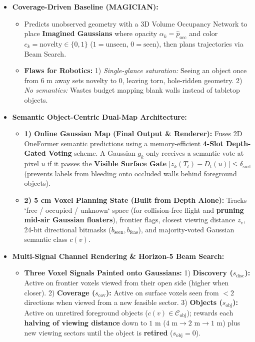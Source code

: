 \documentclass[11pt,a4paper]{article}
\theoremstyle{definition}
\theoremstyle{plain}
\theoremstyle{remark}
\begin{document}
\begin{itemize}
    \item \textbf{Coverage-Driven Baseline (MAGICIAN):}
    \begin{itemize}
        \item Predicts unobserved geometry with a 3D Volume Occupancy Network to place \textbf{Imagined Gaussians} where opacity $\alpha_k = \hat{p}_{\text{occ}}$ and color $c_k = \text{novelty} \in \{0,1\}$ ($1=\text{unseen}$, $0=\text{seen}$), then plans trajectories via Beam Search.
        \item \textbf{Flaws for Robotics:} 1) \emph{Single-glance saturation:} Seeing an object once from $6\text{ m}$ away sets novelty to $0$, leaving torn, hole-ridden geometry. 2) \emph{No semantics:} Wastes budget mapping blank walls instead of tabletop objects.
    \end{itemize}
    \item \textbf{Semantic Object-Centric Dual-Map Architecture:}
    \begin{itemize}
        \item \textbf{1) Online Gaussian Map (Final Output \& Renderer):} Fuses 2D OneFormer semantic predictions using a memory-efficient \textbf{4-Slot Depth-Gated Voting} scheme. A Gaussian $g_k$ only receives a semantic vote at pixel $u$ if it passes the \textbf{Visible Surface Gate} $|z_k(T_t) - D_t(u)| \le \delta_{\text{surf}}$ (prevents labels from bleeding onto occluded walls behind foreground objects).
        \item \textbf{2) 5 cm Voxel Planning State (Built from Depth Alone):} Tracks `free / occupied / unknown` space (for collision-free flight and \textbf{pruning mid-air Gaussian floaters}), frontier flags, closest viewing distance $z_v$, 24-bit directional bitmasks ($b_{\text{seen}}, b_{\text{feas}}$), and majority-voted Gaussian semantic class $c(v)$.
    \end{itemize}
    \item \textbf{Multi-Signal Channel Rendering \& Horizon-5 Beam Search:}
    \begin{itemize}
        \item \textbf{Three Voxel Signals Painted onto Gaussians:}
        1) \textbf{Discovery ($s_{\text{disc}}$):} Active on frontier voxels viewed from their open side (higher when closer).
        2) \textbf{Coverage ($s_{\text{cov}}$):} Active on surface voxels seen from $<2$ directions when viewed from a new feasible sector.
        3) \textbf{Objects ($s_{\text{obj}}$):} Active on unretired foreground objects ($c(v)\in\mathcal{C}_{\text{obj}}$); rewards each \textbf{halving of viewing distance} down to $1\text{ m}$ ($4\text{ m} \to 2\text{ m} \to 1\text{ m}$) plus new viewing sectors until the object is \textbf{retired} ($s_{\text{obj}}=0$).

\end{itemize}
\end{itemize}
\end{document}
